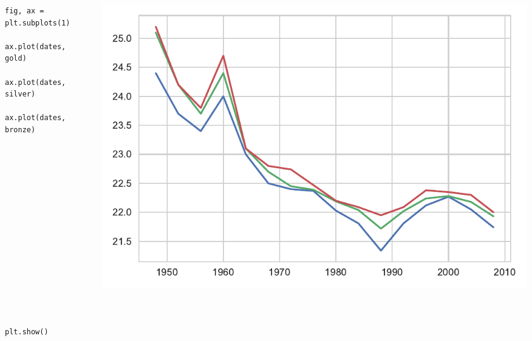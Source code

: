 \documentclass{beamer}
\begin{document}
\begin{frame}[fragile]
\tiny{
\begin{columns}
\begin{column}{0.45\textwidth}
\begin{verbatim}
fig, ax = plt.subplots(1)

ax.plot(dates, gold)

ax.plot(dates, silver)

ax.plot(dates, bronze)
















plt.show()
\end{verbatim}
\end{column}
\begin{column}{0.55\textwidth}
\includegraphics[width=\textwidth]{../olympics_1.pdf}
\end{column}
\end{columns}
}
\end{frame}
\end{document}
